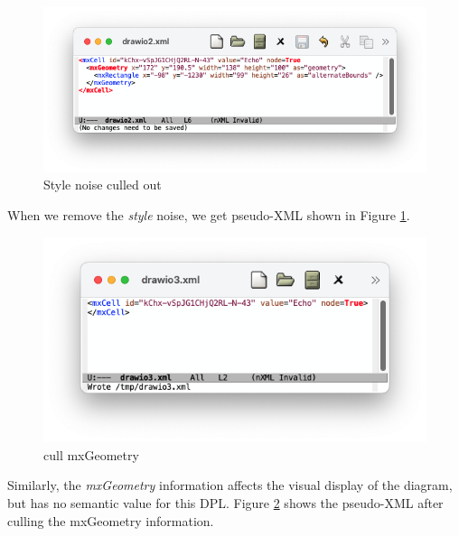\documentclass[10pt,anonymous,review]{acmart}
\begin{document}
\begin{figure}
    \includegraphics[trim=1cm 2cm 1.5cm 1cm, clip, scale=0.4]{./media/drawio2.png}
    \caption{Style noise culled out}
    \label{drawio2}
\end{figure}
When we remove the \emph{style} noise, we get pseudo-XML shown in Figure \ref{drawio2}.

 
\begin{figure}
    \includegraphics[trim=2cm 2cm 2cm 1.7cm, clip, scale=0.4]{./media/drawio3.png}
    \caption{cull mxGeometry}
    \label{drawio3}
\end{figure}
Similarly, the \emph{mxGeometry} information affects the visual display of the diagram, but has no semantic value for this DPL.
Figure \ref{drawio3} shows the pseudo-XML after culling the mxGeometry information.
  
\end{document}
